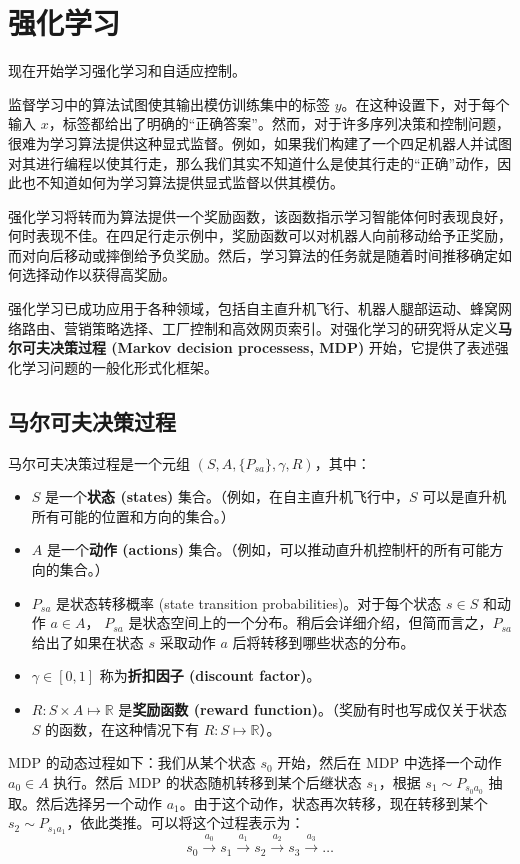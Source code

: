\chapter{强化学习}

现在开始学习强化学习和自适应控制。

监督学习中的算法试图使其输出模仿训练集中的标签 $y$。在这种设置下，对于每个输入 $x$，标签都给出了明确的“正确答案”。然而，对于许多序列决策和控制问题，很难为学习算法提供这种显式监督。例如，如果我们构建了一个四足机器人并试图对其进行编程以使其行走，那么我们其实不知道什么是使其行走的“正确”动作，因此也不知道如何为学习算法提供显式监督以供其模仿。

强化学习将转而为算法提供一个奖励函数，该函数指示学习智能体何时表现良好，何时表现不佳。在四足行走示例中，奖励函数可以对机器人向前移动给予正奖励，而对向后移动或摔倒给予负奖励。然后，学习算法的任务就是随着时间推移确定如何选择动作以获得高奖励。

强化学习已成功应用于各种领域，包括自主直升机飞行、机器人腿部运动、蜂窝网络路由、营销策略选择、工厂控制和高效网页索引。对强化学习的研究将从定义\textbf{马尔可夫决策过程 (Markov decision processess, MDP)} 开始，它提供了表述强化学习问题的一般化形式化框架。

\section{马尔可夫决策过程}

马尔可夫决策过程是一个元组 $(S, A, \{P_{s a}\}, \gamma, R)$，其中：
\begin{itemize}
    \item $S$ 是一个\textbf{状态 (states)} 集合。（例如，在自主直升机飞行中，$S$ 可以是直升机所有可能的位置和方向的集合。）
    \item $A$ 是一个\textbf{动作 (actions)} 集合。（例如，可以推动直升机控制杆的所有可能方向的集合。）
    \item $P_{sa}$ 是状态转移概率 (state transition probabilities)。对于每个状态 $s \in S$ 和动作 $a \in A$， $P_{sa}$ 是状态空间上的一个分布。稍后会详细介绍，但简而言之，$P_{sa}$ 给出了如果在状态 $s$ 采取动作 $a$ 后将转移到哪些状态的分布。
    \item $\gamma \in [0, 1]$ 称为\textbf{折扣因子 (discount factor)}。
    \item $R: S \times A \mapsto \mathbb{R}$ 是\textbf{奖励函数 (reward function)}。（奖励有时也写成仅关于状态 $S$ 的函数，在这种情况下有 $R: S \mapsto \mathbb{R}$）。
\end{itemize}
MDP 的动态过程如下：我们从某个状态 $s_0$ 开始，然后在 MDP 中选择一个动作 $a_0 \in A$ 执行。然后 MDP 的状态随机转移到某个后继状态 $s_1$，根据 $s_1 \sim P_{s_0 a_0}$ 抽取。然后选择另一个动作 $a_1$。由于这个动作，状态再次转移，现在转移到某个 $s_2 \sim P_{s_1 a_1}$，依此类推。可以将这个过程表示为：
\[
    s_0 \xrightarrow{a_0} s_1 \xrightarrow{a_1} s_2 \xrightarrow{a_2} s_3 \xrightarrow{a_3} \dots
\]

